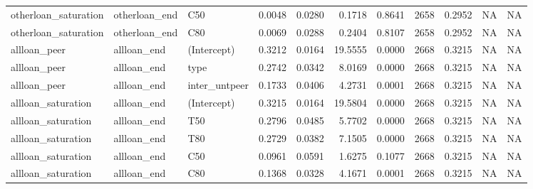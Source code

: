 \begin{table}
\begin{tabular}[t]{lllrrrrrrll}
otherloan\_saturation & otherloan\_end & C50 & 0.0048 & 0.0280 & 0.1718 & 0.8641 & 2658 & 0.2952 & NA & NA\\
otherloan\_saturation & otherloan\_end & C80 & 0.0069 & 0.0288 & 0.2404 & 0.8107 & 2658 & 0.2952 & NA & NA\\
allloan\_peer & allloan\_end & (Intercept) & 0.3212 & 0.0164 & 19.5555 & 0.0000 & 2668 & 0.3215 & NA & NA\\
allloan\_peer & allloan\_end & type & 0.2742 & 0.0342 & 8.0169 & 0.0000 & 2668 & 0.3215 & NA & NA\\
\addlinespace
allloan\_peer & allloan\_end & inter\_untpeer & 0.1733 & 0.0406 & 4.2731 & 0.0001 & 2668 & 0.3215 & NA & NA\\
allloan\_saturation & allloan\_end & (Intercept) & 0.3215 & 0.0164 & 19.5804 & 0.0000 & 2668 & 0.3215 & NA & NA\\
allloan\_saturation & allloan\_end & T50 & 0.2796 & 0.0485 & 5.7702 & 0.0000 & 2668 & 0.3215 & NA & NA\\
allloan\_saturation & allloan\_end & T80 & 0.2729 & 0.0382 & 7.1505 & 0.0000 & 2668 & 0.3215 & NA & NA\\
allloan\_saturation & allloan\_end & C50 & 0.0961 & 0.0591 & 1.6275 & 0.1077 & 2668 & 0.3215 & NA & NA\\
\addlinespace
allloan\_saturation & allloan\_end & C80 & 0.1368 & 0.0328 & 4.1671 & 0.0001 & 2668 & 0.3215 & NA & NA\\
\bottomrule
\end{tabular}
\end{table}
